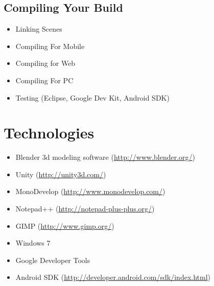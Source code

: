 \documentclass[letterpaper,10pt,english]{sphinxmanual}
\begin{document}
\subsection{Compiling Your Build}
\label{gamedev:compiling-your-build}\begin{itemize}
\item {} 
Linking Scenes

\item {} 
Compiling For Mobile

\item {} 
Compiling for Web

\item {} 
Compiling For PC

\item {} 
Testing (Eclipse, Google Dev Kit, Android SDK)

\end{itemize}


\section{Technologies}
\label{gamedev:technologies}\begin{itemize}
\item {} 
Blender 3d modeling software (\href{http://www.blender.org/}{http://www.blender.org/})

\item {} 
Unity (\href{http://unity3d.com/}{http://unity3d.com/})

\item {} 
MonoDevelop (\href{http://www.monodevelop.com/}{http://www.monodevelop.com/})

\item {} 
Notepad++ (\href{http://notepad-plus-plus.org/}{http://notepad-plus-plus.org/})

\item {} 
GIMP (\href{http://www.gimp.org/}{http://www.gimp.org/})

\item {} 
Windows 7

\item {} 
Google Developer Tools

\item {} 
Android SDK (\href{http://developer.android.com/sdk/index.html}{http://developer.android.com/sdk/index.html})

\end{itemize}
\end{document}
